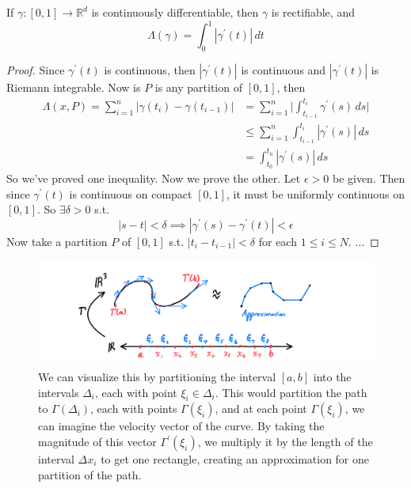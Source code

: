   \begin{theorem}
    If $\gamma: [0, 1] \to \mathbb{R}^d$ is continuously differentiable, then $\gamma$ is rectifiable, and 
    \begin{equation}
      \Lambda(\gamma) = \int_0^1 |\gamma^\prime (t)| \,dt
    \end{equation}
  \end{theorem}
  \begin{proof}
    Since $\gamma^\prime (t)$ is continuous, then $|\gamma^\prime (t)|$ is continuous and $|\gamma^\prime (t)|$ is Riemann integrable. Now is $P$ is any partition of $[0, 1]$, then 
    \begin{align}
      \Lambda(x, P) = \sum_{i=1}^n |\gamma(t_i) - \gamma(t_{i-1})| & = \sum_{i=1}^n \bigg| \int_{t_{i-1}}^{t_i} \gamma^\prime (s) \,ds \bigg| \tag{Fund. Thm. of Calc.}\\ 
                                                                   & \leq \sum_{i=1}^n \int_{t_{i-1}}^{t_i} |\gamma^\prime (s)| \,ds \\ 
                                                                   & = \int_{t_0}^{t_n} |\gamma^\prime (s)| \,ds
    \end{align}
    So we've proved one inequality. Now we prove the other. Let $\epsilon > 0$ be given. Then since $\gamma^\prime (t)$ is continuous on compact $[0, 1]$, it must be uniformly continuous on $[0, 1]$. So $\exists \delta > 0$ s.t. 
    \begin{equation}
      |s - t| < \delta \implies |\gamma^\prime (s) - \gamma^\prime (t)| < \epsilon
    \end{equation} 
    Now take a partition $P$ of $[0, 1]$ s.t. $|t_i - t_{i-1}| < \delta$ for each $1 \leq i \leq N$. ...
  \end{proof}

  \begin{figure}[H]
    \centering 
    \includegraphics[scale=0.25]{img/Arc_Length_Integral.PNG}
    \caption{We can visualize this by partitioning the interval $[a, b]$ into the intervals $\Delta_i$, each with point $\xi_i \in \Delta_i$. This would partition the path to $\Gamma(\Delta_i)$, each with points $\Gamma(\xi_i)$, and at each point $\Gamma(\xi_i)$, we can imagine the velocity vector of the curve. By taking the magnitude of this vector $\Gamma^\prime (\xi_i)$, we multiply it by the length of the interval $\Delta x_i$ to get one rectangle, creating an approximation for one partition of the path. } 
    \label{fig:Arc_Length_Integral}
  \end{figure}


